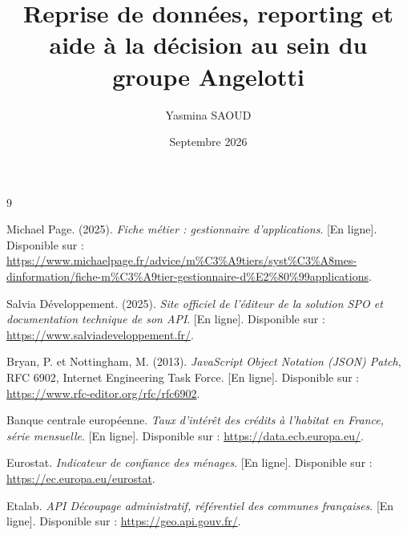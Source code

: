 \documentclass[12pt, french]{report}
\title{\Huge{Reprise de données, reporting et aide à la décision au sein du
groupe Angelotti}}
\author{Yasmina SAOUD}
\date{Septembre 2026}
\begin{document}
\dominitoc
{}



\clearpage
\tableofcontents
\clearpage
{}

\clearpage
{}
\listoffigures

\clearpage
{}











\begin{thebibliography}{9}

Michael Page. (2025). \textit{Fiche métier : gestionnaire d'applications}. [En ligne]. Disponible sur : \url{https://www.michaelpage.fr/advice/m%C3%A9tiers/syst%C3%A8mes-dinformation/fiche-m%C3%A9tier-gestionnaire-d%E2%80%99applications}.

Salvia Développement. (2025). \textit{Site officiel de l'éditeur de la solution SPO et documentation technique de son API}. [En ligne]. Disponible sur : \url{https://www.salviadeveloppement.fr/}.

Bryan, P. et Nottingham, M. (2013). \textit{JavaScript Object Notation (JSON) Patch}, RFC 6902, Internet Engineering Task Force. [En ligne]. Disponible sur : \url{https://www.rfc-editor.org/rfc/rfc6902}.

Banque centrale européenne. \textit{Taux d'intérêt des crédits à l'habitat en France, série mensuelle}. [En ligne]. Disponible sur : \url{https://data.ecb.europa.eu/}.

Eurostat. \textit{Indicateur de confiance des ménages}. [En ligne]. Disponible sur : \url{https://ec.europa.eu/eurostat}.

Etalab. \textit{API Découpage administratif, référentiel des communes françaises}. [En ligne]. Disponible sur : \url{https://geo.api.gouv.fr/}.

\end{thebibliography}
\end{document}
